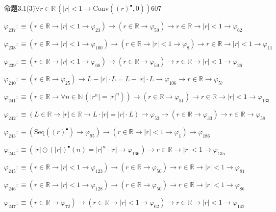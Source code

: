 \begin{fullproof}{命題3.1(3)}{$\forall r \in \mathbb{R}\,(\lvert r \rvert < 1 \to \mathrm{Conv}({(r)^{\bullet}},0))$}{607}
\begin{abbrevlist}
\item $\varphi_{237} :\equiv (r \in \mathbb{R} \to \lvert r \rvert < 1 \to \varphi_{23}) \to (r \in \mathbb{R} \to \varphi_{50}) \to r \in \mathbb{R} \to \lvert r \rvert < 1 \to \varphi_{62}$
\item $\varphi_{238} :\equiv (r \in \mathbb{R} \to \lvert r \rvert < 1 \to \varphi_{100}) \to (r \in \mathbb{R} \to \lvert r \rvert < 1 \to \varphi_{8}) \to r \in \mathbb{R} \to \lvert r \rvert < 1 \to \varphi_{11}$
\item $\varphi_{239} :\equiv (r \in \mathbb{R} \to \lvert r \rvert < 1 \to \varphi_{68}) \to (r \in \mathbb{R} \to \varphi_{50}) \to r \in \mathbb{R} \to \lvert r \rvert < 1 \to \varphi_{26}$
\item $\varphi_{240} :\equiv (r \in \mathbb{R} \to \varphi_{25}) \to L - \lvert r \rvert \cdot L = L - \lvert r \rvert \cdot L \to \varphi_{106} \to r \in \mathbb{R} \to \varphi_{57}$
\item $\varphi_{241} :\equiv (r \in \mathbb{R} \to \forall n \in \mathbb{N}\,(\lvert {{r}^{n}} \rvert = {{\lvert r \rvert}^{n}})) \to (r \in \mathbb{R} \to \varphi_{51}) \to r \in \mathbb{R} \to \lvert r \rvert < 1 \to \varphi_{133}$
\item $\varphi_{242} :\equiv (L \in \mathbb{R} \to \lvert r \rvert \in \mathbb{R} \to L \cdot \lvert r \rvert = \lvert r \rvert \cdot L) \to \varphi_{53} \to (r \in \mathbb{R} \to \varphi_{33}) \to r \in \mathbb{R} \to \varphi_{58}$
\item $\varphi_{243} :\equiv (\mathrm{Seq}({(r)^{\bullet}}) \to \varphi_{95}) \to (r \in \mathbb{R} \to \lvert r \rvert < 1 \to \varphi_{1}) \to \varphi_{186}$
\item $\varphi_{244} :\equiv (\lvert r \rvert \odot {(\lvert r \rvert)^{\bullet}}(n) = {{\lvert r \rvert}^{n}} \cdot \lvert r \rvert \to \varphi_{166}) \to r \in \mathbb{R} \to \lvert r \rvert < 1 \to \varphi_{135}$
\item $\varphi_{245} :\equiv (r \in \mathbb{R} \to \lvert r \rvert < 1 \to \varphi_{123}) \to (r \in \mathbb{R} \to \varphi_{50}) \to r \in \mathbb{R} \to \lvert r \rvert < 1 \to \varphi_{81}$
\item $\varphi_{246} :\equiv (r \in \mathbb{R} \to \lvert r \rvert < 1 \to \varphi_{128}) \to (r \in \mathbb{R} \to \varphi_{50}) \to r \in \mathbb{R} \to \lvert r \rvert < 1 \to \varphi_{86}$
\item $\varphi_{247} :\equiv (r \in \mathbb{R} \to \varphi_{72}) \to (r \in \mathbb{R} \to \lvert r \rvert < 1 \to \varphi_{62}) \to r \in \mathbb{R} \to \lvert r \rvert < 1 \to \varphi_{142}$

\end{abbrevlist}
\end{fullproof}
